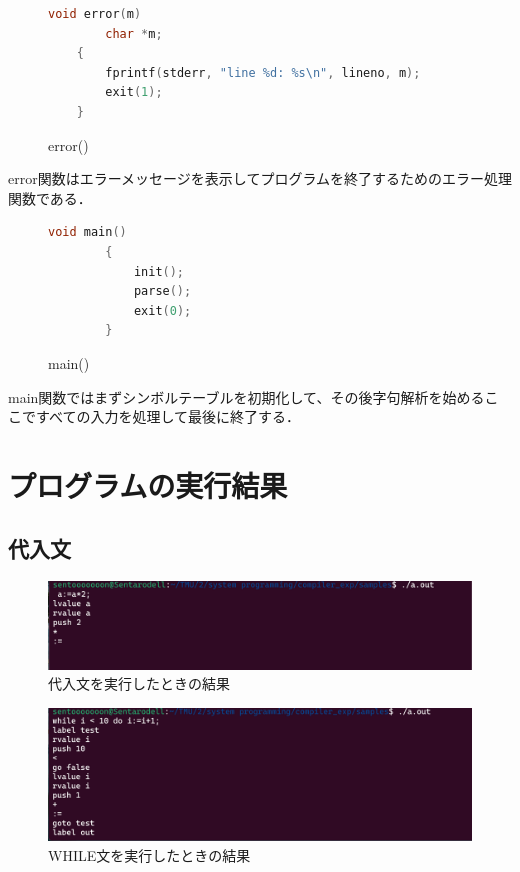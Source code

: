 \documentclass[fleqn, a4paper. 12pt]{ltjsarticle} %
\begin{document}
  \begin{figure}[H]
	\centering
	\begin{lstlisting}[language=C, caption={}, label=sample-code]
		void error(m)
		char *m;
	{
		fprintf(stderr, "line %d: %s\n", lineno, m);
		exit(1);
	}
	\end{lstlisting}
	\caption{error()}
	\label{error}
  \end{figure}
  error関数はエラーメッセージを表示してプログラムを終了するためのエラー処理関数である．

  \begin{figure}[H]
	\centering
	\begin{lstlisting}[language=C, caption={}, label=sample-code]
		void main()
		{
			init();
			parse();
			exit(0);
		}
	\end{lstlisting}
	\caption{main()}
	\label{main}
  \end{figure}
  main関数ではまずシンボルテーブルを初期化して、その後字句解析を始めるここですべての入力を処理して最後に終了する．

  

  \section{プログラムの実行結果}
  \subsection{代入文}
  \begin{figure}[H]
	\centering
	\includegraphics[width=0.8\linewidth]{"images/ASSIGN.png"}
	\caption{代入文を実行したときの結果}
	\label{fig:ASSIGN}
  \end{figure}
  
  \begin{figure}[H]
	\centering
	\includegraphics[width=0.8\linewidth]{"images/WHILE.png"}
	\caption{WHILE文を実行したときの結果}
	\label{fig:WHILE}
  \end{figure}
\end{document}
